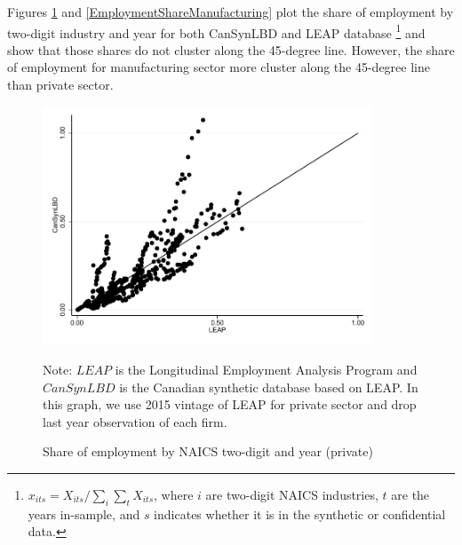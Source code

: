 \documentclass{article}
\begin{document}
Figures \ref{EmploymentSharePrivate} and \ref{EmploymentShareManufacturing} plot the share of employment by two-digit industry and year for both CanSynLBD and LEAP database
\footnote{$x_{its} = X_{its}/\sum_{i} \sum_{t} X_{its}$, where $i$ are two-digit NAICS industries, $t$ are the years in-sample, and $s$ indicates whether it is in the synthetic or confidential data. } and show that those shares do not cluster along the 45-degree line. However, the share of employment for manufacturing sector more cluster along the 45-degree line than private sector.
\begin{figure} [H]
\centering
\caption{Share of employment by NAICS two-digit and year (private)} \label{EmploymentSharePrivate}
\includegraphics[height=2.8in, width=.7\linewidth]{graphs/Share_of_employment_by_NAICS_two-digit_and_year_private_bw.pdf} 
\begin{minipage}{0.85\textwidth}
{\footnotesize Note: $LEAP$ is the Longitudinal Employment Analysis Program and $CanSynLBD$ is the Canadian synthetic database based on LEAP. In this graph, we use 2015 vintage of LEAP for private sector and drop last year observation of each firm. \par}
\end{minipage}
\end{figure}
\vspace{-15.5pt}
\end{document}
